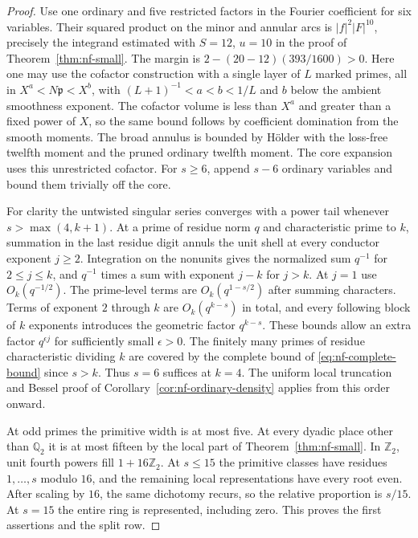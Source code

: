 \documentclass[11pt,letterpaper]{article}
\theoremstyle{definition}
\numberwithin{equation}{section}
\begin{document}
\begin{proof}
Use one ordinary and five restricted factors in the Fourier
coefficient for six variables. Their squared product on the minor
and annular arcs is $|f|^2|F|^{10}$, precisely the integrand
estimated with $S=12$, $u=10$ in the proof of
Theorem~\ref{thm:nf-small}. The margin is
$2-(20-12)(393/1600)>0$. Here one may use the cofactor construction
with a single layer of $L$ marked primes, all in
$X^a<N\mathfrak p<X^b$, with $(L+1)^{-1}<a<b<1/L$ and $b$ below
the ambient smoothness exponent. The cofactor volume is less than
$X^a$ and greater than a fixed power of $X$, so the same bound
follows by coefficient domination from the smooth moments.
The broad annulus is bounded by H\"older with the loss-free
twelfth moment and the pruned ordinary twelfth moment. The core
expansion uses this unrestricted cofactor. For $s\ge6$, append
$s-6$ ordinary variables and bound them trivially off the core.

For clarity the untwisted singular series converges with a power
tail whenever $s>\max(4,k+1)$. At a prime of residue norm $q$ and
characteristic prime to $k$, summation in the last residue digit
annuls the unit shell at every conductor exponent $j\ge2$.
Integration on the nonunits gives the normalized sum $q^{-1}$
for $2\le j\le k$, and $q^{-1}$ times a sum with exponent $j-k$
for $j>k$. At $j=1$ use $O_k(q^{-1/2})$. The prime-level terms
are $O_k(q^{1-s/2})$ after summing characters. Terms of
exponent $2$ through $k$ are $O_k(q^{k-s})$ in total, and every
following block of $k$ exponents introduces the geometric factor
$q^{k-s}$. These bounds allow an extra factor $q^{\epsilon j}$
for sufficiently small $\epsilon>0$. The finitely many primes
of residue characteristic dividing $k$ are covered by the complete
bound of \eqref{eq:nf-complete-bound} since $s>k$.
Thus $s=6$ suffices at $k=4$. The uniform local truncation and Bessel
proof of Corollary~\ref{cor:nf-ordinary-density} applies from this
order onward.

At odd primes the primitive width is at most five. At every dyadic
place other than $\mathbb Q_2$ it is at most fifteen by the local
part of Theorem~\ref{thm:nf-small}. In $\mathbb Z_2$, unit fourth
powers fill $1+16\mathbb Z_2$. At $s\le15$ the primitive classes
have residues $1,\ldots,s$ modulo $16$, and the remaining local
representations have every root even. After scaling by $16$, the
same dichotomy recurs, so the relative proportion is $s/15$.
At $s=15$ the entire ring is represented, including zero.
This proves the first assertions and the split row.


\end{proof}
\end{document}
